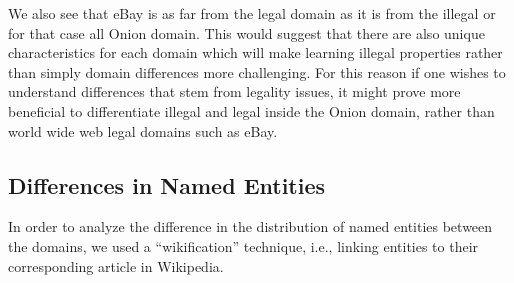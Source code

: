 \documentclass[11pt,a4paper,table]{article}
\newcommand{\oa}[1]{\footnote{\color{red}OA: #1}}
\begin{document}
    We also see that eBay is as far from the legal domain as it is from the illegal or for that case all Onion domain. This would suggest that there are also unique characteristics for each domain which will make learning illegal properties rather than simply domain differences more challenging. For this reason if one wishes to understand differences that stem from legality issues, it might prove more beneficial to differentiate illegal and legal inside the Onion domain, rather than world wide web legal domains such as eBay.

    
%     
% 

\subsection{Differences in Named Entities}

    In order to analyze the difference in the distribution of 
    named entities between the domains,  we used a ``wikification''\cite{bunescu2006using} technique, i.e., linking entities to their corresponding article in Wikipedia.
% 
\end{document}
